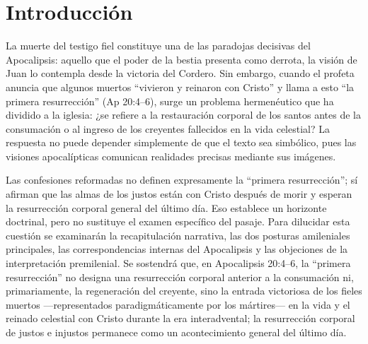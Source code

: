 \section*{Introducción}
La muerte del testigo fiel constituye una de las paradojas decisivas del Apocalipsis: aquello que el poder de la bestia presenta como derrota, la visión de Juan lo contempla desde la victoria del Cordero.
Sin embargo, cuando el profeta anuncia que algunos muertos \enquote{vivieron y reinaron con Cristo} y llama a esto \enquote{la primera resurrección} (Ap 20:4--6), surge un problema hermenéutico que ha dividido a la iglesia: ¿se refiere a la restauración corporal de los santos antes de la consumación o al ingreso de los creyentes fallecidos en la vida celestial?
La respuesta no puede depender simplemente de que el texto sea simbólico, pues las visiones apocalípticas comunican realidades precisas mediante sus imágenes.

Las confesiones reformadas no definen expresamente la \enquote{primera resurrección}; sí afirman que las almas de los justos están con Cristo después de morir y esperan la resurrección corporal general del último día.
Eso establece un horizonte doctrinal, pero no sustituye el examen específico del pasaje.
Para dilucidar esta cuestión se examinarán la recapitulación narrativa, las dos posturas amileniales principales, las correspondencias internas del Apocalipsis y las objeciones de la interpretación premilenial.
Se sostendrá que, en Apocalipsis 20:4--6, la \enquote{primera resurrección} no designa una resurrección corporal anterior a la consumación ni, primariamente, la regeneración del creyente, sino la entrada victoriosa de los fieles muertos —representados paradigmáticamente por los mártires— en la vida y el reinado celestial con Cristo durante la era interadvental; la resurrección corporal de justos e injustos permanece como un acontecimiento general del último día.
